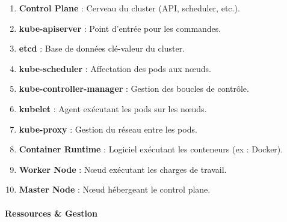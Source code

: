 \documentclass[
  letterpaper,
  DIV=11,
  numbers=noendperiod]{scrartcl}
\makeatletter
\let\oldparagraph\paragraph
\renewcommand{\paragraph}{
    \@ifstar
      \xxxParagraphStar
      \xxxParagraphNoStar
  }
\newcommand{\xxxParagraphStar}[1]{\oldparagraph*{#1}\mbox{}}
\newcommand{\xxxParagraphNoStar}[1]{\oldparagraph{#1}\mbox{}}
\providecommand{\tightlist}{%
  \setlength{\itemsep}{0pt}\setlength{\parskip}{0pt}}\usepackage{longtable,booktabs,array}
\makeatother
\begin{document}
\begin{enumerate}
\def\labelenumi{\arabic{enumi}.}
\setcounter{enumi}{10}
\tightlist
\item
  \textbf{Control Plane} : Cerveau du cluster (API, scheduler, etc.).\\
\item
  \textbf{kube-apiserver} : Point d'entrée pour les commandes.\\
\item
  \textbf{etcd} : Base de données clé-valeur du cluster.\\
\item
  \textbf{kube-scheduler} : Affectation des pods aux nœuds.\\
\item
  \textbf{kube-controller-manager} : Gestion des boucles de contrôle.\\
\item
  \textbf{kubelet} : Agent exécutant les pods sur les nœuds.\\
\item
  \textbf{kube-proxy} : Gestion du réseau entre les pods.\\
\item
  \textbf{Container Runtime} : Logiciel exécutant les conteneurs (ex :
  Docker).\\
\item
  \textbf{Worker Node} : Nœud exécutant les charges de travail.\\
\item
  \textbf{Master Node} : Nœud hébergeant le control plane.
\end{enumerate}

\paragraph{\texorpdfstring{\textbf{Ressources \&
Gestion}}{Ressources \& Gestion}}\label{ressources-gestion}
\end{document}

